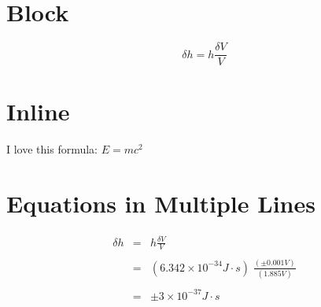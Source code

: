 \documentclass[12pt, letterpaper]{article}
\begin{document}
\section{Block}
$$\delta h=h\frac{\delta V}{V}$$
\section{Inline}
I love this formula: $E=mc^{2}$
\section{Equations in Multiple Lines}
\begin{eqnarray*}
\delta h&=&h\frac{\delta V}{V}\\\\
&=&(6.342\times10^{-34}J\cdot s)\;\frac{(\pm0.001V)}{(1.885V)}\\\\
&=&\pm3\times10^{-37}J\cdot s\\
\end{eqnarray*}
\end{document}
